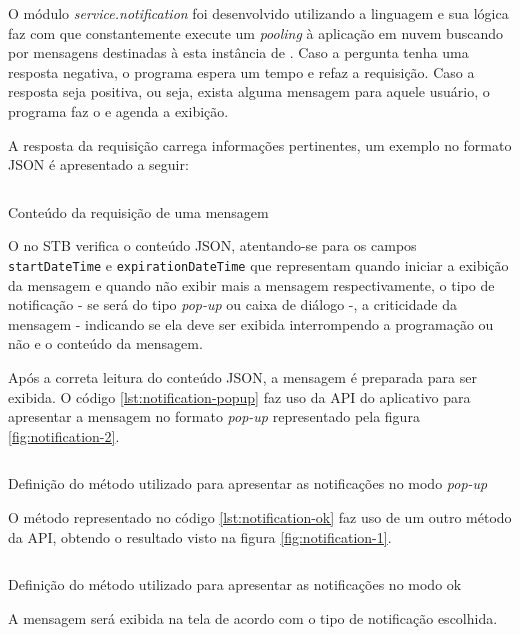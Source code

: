 O módulo \textit{service.notification} foi desenvolvido utilizando a linguagem
\python[] e sua lógica faz com que constantemente execute um \textit{pooling} 
à aplicação em nuvem buscando por mensagens destinadas à esta instância de 
\software. Caso a pergunta tenha uma resposta negativa, o programa espera um 
tempo e refaz a requisição. Caso a resposta seja positiva, ou seja, exista 
alguma mensagem para aquele usuário, o programa faz o \download[] e agenda a
exibição. 

A resposta da requisição carrega informações pertinentes, um exemplo no formato
JSON é apresentado a seguir:

\begin{listing}[ht!]
\inputminted{json}{codigos/message.json}
\caption{Conteúdo da requisição de uma mensagem}
\label{lst:notification-json}
\end{listing}

O \software[] no STB verifica o conteúdo JSON, atentando-se para os campos 
\texttt{startDateTime} e \texttt{expirationDateTime} que representam quando 
iniciar a exibição da mensagem e quando não exibir mais a mensagem 
respectivamente, o tipo de notificação - se será do tipo \textit{pop-up} ou
caixa de diálogo -, a criticidade da mensagem - indicando se ela deve ser
exibida interrompendo a programação ou não e o conteúdo da mensagem. 

Após a correta leitura do conteúdo JSON, a mensagem é preparada para ser 
exibida. O código \ref{lst:notification-popup} faz uso da API do aplicativo
\xbmc[] para apresentar a mensagem no formato \textit{pop-up} representado pela
figura \vref{fig:notification-2}.

\begin{listing}[ht!]
\inputminted{python}{codigos/notification-popup.py}
\caption{Definição do método utilizado para apresentar as notificações no modo
\textit{pop-up}}
\label{lst:notification-popup}
\end{listing}

O método representado no código \ref{lst:notification-ok} faz uso de um outro 
método da API, obtendo o resultado visto na figura \vref{fig:notification-1}.

\begin{listing}[ht!]
\inputminted{python}{codigos/notification-ok.py}
\caption{Definição do método utilizado para apresentar as notificações no modo
ok}
\label{lst:notification-ok}
\end{listing}

A mensagem será exibida na tela de acordo com o tipo de notificação escolhida. 

